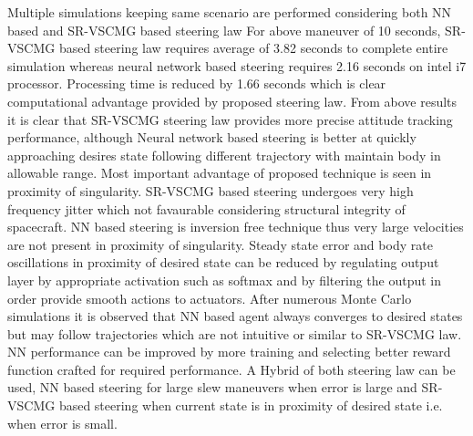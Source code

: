 Multiple simulations keeping same scenario are performed considering both NN based and SR-VSCMG based steering law
For above maneuver of 10 seconds, SR-VSCMG based steering law requires average of 3.82 seconds to complete entire simulation whereas neural network based steering requires 2.16 seconds on  intel i7 processor. Processing time is reduced by 1.66 seconds which is clear computational advantage provided by proposed steering law. 
\noindent From above results it is clear that SR-VSCMG steering law provides more precise attitude tracking performance, although Neural network based steering is better at quickly approaching desires state following different trajectory with maintain body in  allowable range.  Most important advantage of proposed technique is seen in proximity of singularity. SR-VSCMG based steering undergoes very high frequency jitter which not favaurable considering structural integrity of spacecraft. NN based steering is inversion free technique thus very large velocities are not present in proximity of singularity. Steady state error and body rate oscillations in proximity of desired state can be reduced by regulating output layer by appropriate activation such as softmax and by filtering the output in order provide smooth actions to actuators. After numerous Monte Carlo simulations it is observed that NN based agent always converges to desired states but may follow trajectories which are not intuitive or similar to SR-VSCMG law. NN performance can be improved by more training and selecting better reward function crafted for required performance. A Hybrid of both steering law can be used, NN based steering for large slew maneuvers when error is large and SR-VSCMG based steering when current state is in proximity of desired state i.e. when error is small.